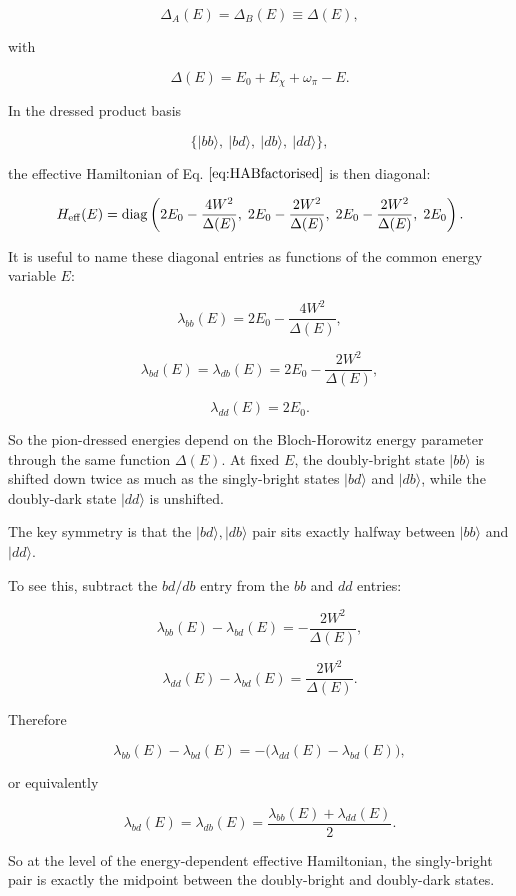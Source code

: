 \documentclass[
]{article}
\renewcommand{\[}{\begin{equation}}
\renewcommand{\]}{\end{equation}}
\begin{document}
\[
\Delta_A(E)=\Delta_B(E)\equiv \Delta(E),
\label{eq:commonDeltaE}
\]

with

\[
\Delta(E)=E_0+E_\chi+\omega_\pi-E.
\label{eq:commonDeltaEdef}
\]

In the dressed product basis

\[
\{|bb\rangle,\ |bd\rangle,\ |db\rangle,\ |dd\rangle\},
\]

the effective Hamiltonian of Eq. \(\ref{eq:HABfactorised}\) is then
diagonal:

\[
H_{\rm eff}(E) =
\mathrm{diag}
\left(
2E_0-\frac{4W^2}{\Delta(E)},
\;
2E_0-\frac{2W^2}{\Delta(E)},
\;
2E_0-\frac{2W^2}{\Delta(E)},
\;
2E_0
\right).
\label{eq:HABdiagIdentical}
\]

It is useful to name these diagonal entries as functions of the common
energy variable \(E\):

\[
\lambda_{bb}(E)=2E_0-\frac{4W^2}{\Delta(E)},
\label{eq:lambdabb}
\]

\[
\lambda_{bd}(E)=\lambda_{db}(E)=2E_0-\frac{2W^2}{\Delta(E)},
\label{eq:lambdabd}
\]

\[
\lambda_{dd}(E)=2E_0.
\label{eq:lambdadd}
\]

So the pion-dressed energies depend on the Bloch-Horowitz energy
parameter through the same function \(\Delta(E)\). At fixed \(E\), the
doubly-bright state \(|bb\rangle\) is shifted down twice as much as the
singly-bright states \(|bd\rangle\) and \(|db\rangle\), while the
doubly-dark state \(|dd\rangle\) is unshifted.

The key symmetry is that the \(|bd\rangle,|db\rangle\) pair sits exactly
halfway between \(|bb\rangle\) and \(|dd\rangle\).

To see this, subtract the \(bd/db\) entry from the \(bb\) and \(dd\)
entries:

\[
\lambda_{bb}(E)-\lambda_{bd}(E) =
-\frac{2W^2}{\Delta(E)},
\label{eq:bbMinusbd}
\]

\[
\lambda_{dd}(E)-\lambda_{bd}(E) =
\frac{2W^2}{\Delta(E)}.
\label{eq:ddMinusbd}
\]

Therefore

\[
\lambda_{bb}(E)-\lambda_{bd}(E) =
-\Big(\lambda_{dd}(E)-\lambda_{bd}(E)\Big),
\label{eq:symmetricSpacing}
\]

or equivalently

\[
\lambda_{bd}(E)=\lambda_{db}(E)=\frac{\lambda_{bb}(E)+\lambda_{dd}(E)}{2}.
\label{eq:midpointRelation}
\]

So at the level of the energy-dependent effective Hamiltonian, the
singly-bright pair is exactly the midpoint between the doubly-bright and
doubly-dark states.
\end{document}
